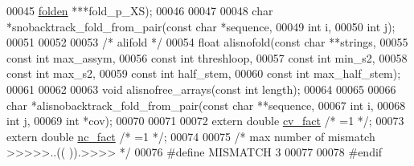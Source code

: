 \begin{DoxyCode}
00045                              \hyperlink{group__data__structures_structnode}{folden} ***fold\_p\_XS);
00046 
00047 
00048 \textcolor{keywordtype}{char} *snobacktrack\_fold\_from\_pair(\textcolor{keyword}{const} \textcolor{keywordtype}{char}  *sequence,
00049                                   \textcolor{keywordtype}{int}         i,
00050                                   \textcolor{keywordtype}{int}         j);
00051 
00052 
00053 \textcolor{comment}{/* alifold */}
00054 \textcolor{keywordtype}{float} alisnofold(\textcolor{keyword}{const} \textcolor{keywordtype}{char} **strings,
00055                  \textcolor{keyword}{const} \textcolor{keywordtype}{int}  max\_assym,
00056                  \textcolor{keyword}{const} \textcolor{keywordtype}{int}  threshloop,
00057                  \textcolor{keyword}{const} \textcolor{keywordtype}{int}  min\_s2,
00058                  \textcolor{keyword}{const} \textcolor{keywordtype}{int}  max\_s2,
00059                  \textcolor{keyword}{const} \textcolor{keywordtype}{int}  half\_stem,
00060                  \textcolor{keyword}{const} \textcolor{keywordtype}{int}  max\_half\_stem);
00061 
00062 
00063 \textcolor{keywordtype}{void}  alisnofree\_arrays(\textcolor{keyword}{const} \textcolor{keywordtype}{int} length);
00064 
00065 
00066 \textcolor{keywordtype}{char} *alisnobacktrack\_fold\_from\_pair(\textcolor{keyword}{const} \textcolor{keywordtype}{char} **sequence,
00067                                      \textcolor{keywordtype}{int}        i,
00068                                      \textcolor{keywordtype}{int}        j,
00069                                      \textcolor{keywordtype}{int}        *cov);
00070 
00071 
00072 \textcolor{keyword}{extern} \textcolor{keywordtype}{double} \hyperlink{alifold_8h_af3cbac6ff5d706d6e414677841ddf94c}{cv\_fact} \textcolor{comment}{/* =1 */};
00073 \textcolor{keyword}{extern} \textcolor{keywordtype}{double} \hyperlink{alifold_8h_a502948a122a2af5b914355b1f3ea2f61}{nc\_fact} \textcolor{comment}{/* =1 */};
00074 
00075 \textcolor{comment}{/* max number of mismatch >>>>>..((   )).>>>> */}
00076 \textcolor{preprocessor}{#define MISMATCH 3}
00077 
00078 \textcolor{preprocessor}{#endif}
\end{DoxyCode}
